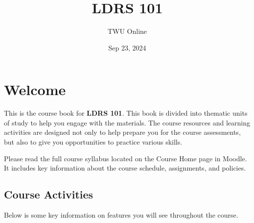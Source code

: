 \documentclass[
  letterpaper,
  DIV=11,
  numbers=noendperiod]{scrreprt}
\title{LDRS 101}
\author{TWU Online}
\date{Sep 23, 2024}
\renewcommand*\contentsname{Table of contents}
\newcommand\contentsname{Table of contents}
\begin{document}
\maketitle

\renewcommand*\contentsname{Table of contents}
{
\hypersetup{linkcolor=}
\setcounter{tocdepth}{2}
\tableofcontents
}


\chapter*{Welcome}\label{welcome}


This is the course book for \textbf{LDRS 101}. This book is divided into
thematic units of study to help you engage with the materials. The
course resources and learning activities are designed not only to help
prepare you for the course assessments, but also to give you
opportunities to practice various skills.

\begin{tcolorbox}[enhanced jigsaw, toprule=.15mm, colback=white, colframe=quarto-callout-note-color-frame, arc=.35mm, opacityback=0, breakable, rightrule=.15mm, bottomrule=.15mm, leftrule=.75mm, left=2mm]
\begin{minipage}[t]{5.5mm}
\textcolor{quarto-callout-note-color}{\faInfo}
\end{minipage}%
\begin{minipage}[t]{\textwidth - 5.5mm}

Please read the full course syllabus located on the Course Home page in
Moodle. It includes key information about the course schedule,
assignments, and policies.

\end{minipage}%
\end{tcolorbox}

\section*{Course Activities}\label{course-activities}


Below is some key information on features you will see throughout the
course.
\end{document}
